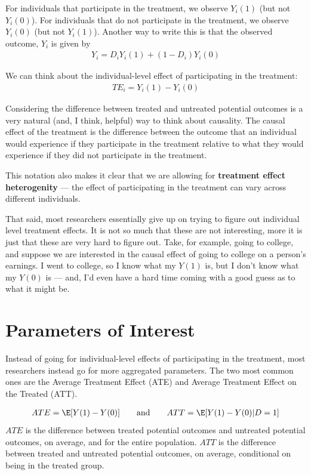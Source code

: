 \documentclass[
  letterpaper,
  DIV=11,
  numbers=noendperiod]{scrreprt}
\begin{document}
For individuals that participate in the treatment, we observe \(Y_i(1)\)
(but not \(Y_i(0)\)). For individuals that do not participate in the
treatment, we observe \(Y_i(0)\) (but not \(Y_i(1)\)). Another way to
write this is that the observed outcome, \(Y_i\) is given by
\begin{align*}
  Y_i = D_i Y_i(1) + (1-D_i) Y_i(0)
\end{align*}

We can think about the individual-level effect of participating in the
treatment: \begin{align*}
  TE_i = Y_i(1) - Y_i(0)
\end{align*}

Considering the difference between treated and untreated potential
outcomes is a very natural (and, I think, helpful) way to think about
causality. The causal effect of the treatment is the difference between
the outcome that an individual would experience if they participate in
the treatment relative to what they would experience if they did not
participate in the treatment.

This notation also makes it clear that we are allowing for
\textbf{treatment effect heterogenity} --- the effect of participating
in the treatment can vary across different individuals.

That said, most researchers essentially give up on trying to figure out
individual level treatment effects. It is not so much that these are not
interesting, more it is just that these are very hard to figure out.
Take, for example, going to college, and suppose we are interested in
the causal effect of going to college on a person's earnings. I went to
college, so I know what my \(Y(1)\) is, but I don't know what my
\(Y(0)\) is --- and, I'd even have a hard time coming with a good guess
as to what it might be.

\section{Parameters of Interest}\label{parameters-of-interest}

Instead of going for individual-level effects of participating in the
treatment, most researchers instead go for more aggregated parameters.
The two most common ones are the Average Treatment Effect (ATE) and
Average Treatment Effect on the Treated (ATT).

\begin{align*}
  ATE = \E[Y(1) - Y(0)] \qquad \textrm{and} \qquad ATT = \E[Y(1)-Y(0) | D=1]
\end{align*} \(ATE\) is the difference between treated potential
outcomes and untreated potential outcomes, on average, and for the
entire population. \(ATT\) is the difference between treated and
untreated potential outcomes, on average, conditional on being in the
treated group.
\end{document}
